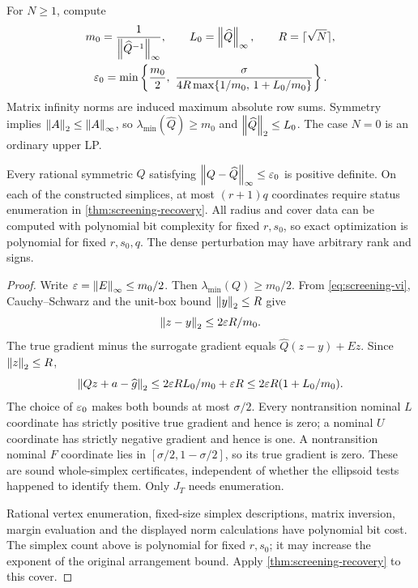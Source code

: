 For $N\ge1$, compute
\begin{equation}\label{eq:screening-radius}
 \begin{gathered}
 m_0=\frac1{\left\lVert\widehat Q^{-1}\right\rVert_\infty},\qquad
 L_0=\left\lVert\widehat Q\right\rVert_\infty,\qquad R=\lceil\sqrt N\rceil,\\
 \varepsilon_0=\min\left\{\frac{m_0}{2},\
       \frac{\sigma}{4R\max\{1/m_0,\,1+L_0/m_0\}}\right\}.
 \end{gathered}
\end{equation}
Matrix infinity norms are induced maximum absolute row sums. Symmetry
implies $\left\lVert A\right\rVert_2\le\left\lVert A\right\rVert_\infty$, so
$\lambda_{\min}(\widehat Q)\ge m_0$ and
$\left\lVert\widehat Q\right\rVert_2\le L_0$. The case $N=0$ is an ordinary upper LP.

\begin{corollary}
\label{cor:screening-neighborhood}
Every rational symmetric $Q$ satisfying
$\left\lVert Q-\widehat Q\right\rVert_\infty\le\varepsilon_0$ is positive definite. On each
of the constructed simplices, at most $(r+1)q$ coordinates require
status enumeration in \cref{thm:screening-recovery}. All radius and
cover data can be computed with polynomial bit complexity for fixed
$r,s_0$, so exact optimization is polynomial for fixed $r,s_0,q$.
The dense perturbation may have arbitrary rank and signs.
\end{corollary}
\begin{proof}
Write $\varepsilon=\left\lVert E\right\rVert_\infty\le m_0/2$. Then
$\lambda_{\min}(Q)\ge m_0/2$. From \eqref{eq:screening-vi},
Cauchy--Schwarz and the unit-box bound $\left\lVert y\right\rVert_2\le R$ give
\begin{equation}\label{eq:screening-norm-response}
                          \left\lVert z-y\right\rVert_2\le 2\varepsilon R/m_0.
\end{equation}
The true gradient minus the surrogate gradient equals
$\widehat Q(z-y)+Ez$. Since $\left\lVert z\right\rVert_2\le R$,
\begin{equation}\label{eq:screening-norm-gradient}
 \left\lVert Qz+a-\widehat g\right\rVert_2
       \le 2\varepsilon RL_0/m_0+\varepsilon R
       \le 2\varepsilon R(1+L_0/m_0).
\end{equation}
The choice of $\varepsilon_0$ makes both bounds at most $\sigma/2$.
Every nontransition nominal $L$ coordinate has strictly positive true
gradient and hence is zero; a nominal $U$ coordinate has strictly
negative gradient and hence is one. A nontransition nominal $F$
coordinate lies in $[\sigma/2,1-\sigma/2]$, so its true gradient
is zero. These are sound whole-simplex certificates, independent of
whether the ellipsoid tests happened to identify them. Only $J_T$
needs enumeration.

Rational vertex enumeration, fixed-size simplex descriptions, matrix
inversion, margin evaluation and the displayed norm calculations have
polynomial bit cost. The simplex count above is polynomial for fixed
$r,s_0$; it may increase the exponent of the original arrangement
bound. Apply \cref{thm:screening-recovery} to this cover.
\end{proof}

